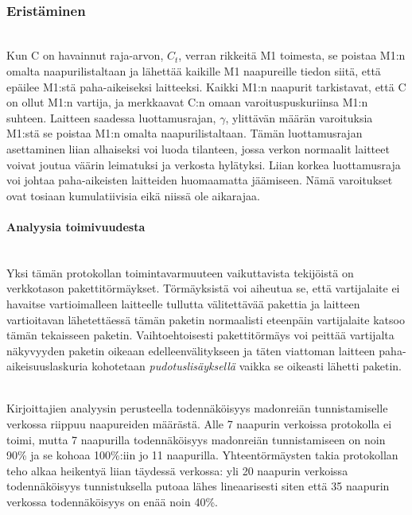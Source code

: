 \documentclass[finnish]{tktltiki2}
\theoremstyle{definition}
\theoremstyle{remark}
\begin{document}
\noindent\\

\subsubsection{Eristäminen}
\noindent \\
Kun C on havainnut raja-arvon, $C_t$, verran rikkeitä M1 toimesta, se poistaa M1:n omalta naapurilistaltaan ja lähettää kaikille M1 naapureille tiedon siitä, että epäilee M1:stä paha-aikeiseksi laitteeksi. Kaikki M1:n naapurit tarkistavat, että C on ollut M1:n vartija, ja merkkaavat C:n omaan varoituspuskuriinsa M1:n suhteen. Laitteen saadessa luottamusrajan, $\gamma$, ylittävän määrän varoituksia M1:stä se poistaa M1:n omalta naapurilistaltaan. Tämän luottamusrajan asettaminen liian alhaiseksi voi luoda tilanteen, jossa verkon normaalit laitteet voivat joutua väärin leimatuksi ja verkosta hylätyksi. Liian korkea luottamusraja voi johtaa paha-aikeisten laitteiden huomaamatta jäämiseen. Nämä varoitukset ovat tosiaan kumulatiivisia eikä niissä ole aikarajaa.

\paragraph{Analyysia toimivuudesta}
\noindent \\
Yksi tämän protokollan toimintavarmuuteen vaikuttavista tekijöistä on verkkotason pakettitörmäykset. Törmäyksistä voi aiheutua se, että vartijalaite ei havaitse vartioimalleen laitteelle tullutta välitettävää pakettia ja laitteen vartioitavan lähetettäessä tämän paketin normaalisti eteenpäin vartijalaite katsoo tämän tekaisseen paketin. Vaihtoehtoisesti pakettitörmäys voi peittää vartijalta näkyvyyden paketin oikeaan edelleenvälitykseen ja täten viattoman laitteen paha-aikeisuuslaskuria kohotetaan \emph{pudotuslisäyksellä} vaikka se oikeasti lähetti paketin.

\noindent \\
Kirjoittajien analyysin perusteella todennäköisyys madonreiän tunnistamiselle verkossa riippuu naapureiden määrästä. Alle 7 naapurin verkoissa protokolla ei toimi, mutta 7 naapurilla todennäköisyys madonreiän tunnistamiseen on noin 90\% ja se kohoaa 100\%:iin jo 11 naapurilla. Yhteentörmäysten takia protokollan teho alkaa heikentyä liian täydessä verkossa: yli 20 naapurin verkoissa todennäköisyys tunnistuksella putoaa lähes lineaarisesti siten että 35 naapurin verkossa todennäköisyys on enää noin 40\%.
\end{document}
